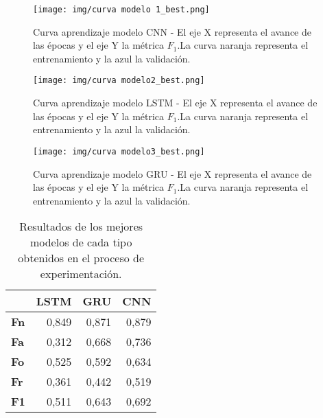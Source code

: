         \begin{figure}[H]
            \centering
            \texttt{[image: img/curva modelo 1\_best.png]}
            \caption{Curva aprendizaje modelo CNN - El eje X representa el avance de las épocas y el eje Y la métrica $F_1$.La curva naranja representa el entrenamiento y la azul la validación.}
            \label{fig:curva_model1}
        \end{figure}
        
        
        
        \begin{figure}[H]
            \centering
            \texttt{[image: img/curva modelo2\_best.png]}
            \caption{Curva aprendizaje modelo LSTM - El eje X representa el avance de las épocas y el eje Y la métrica $F_1$.La curva naranja representa el entrenamiento y la azul la validación.}
            \label{fig:curva_model2}
        \end{figure}
        
        
        
        \begin{figure}[H]
            \centering
            \texttt{[image: img/curva modelo3\_best.png]}
            \caption{Curva aprendizaje modelo GRU - El eje X representa el avance de las épocas y el eje Y la métrica $F_1$.La curva naranja representa el entrenamiento y la azul la validación.}
            \label{fig:curva_model3}
        \end{figure}


        \begin{table}[htbp]
        \caption{Resultados de los mejores modelos de cada tipo obtenidos en el proceso de experimentación.}
        \begin{center}
        \begin{tabular}{|l|r|r|r|}
        \hline
        \textbf{} & \multicolumn{1}{l|}{\textbf{LSTM}} & \multicolumn{1}{l|}{\textbf{GRU}} & \multicolumn{1}{l|}{\textbf{CNN}} \\ \hline
        \textbf{Fn} & 0,849 & 0,871 & 0,879 \\ \hline
        \textbf{Fa} & 0,312 & 0,668 & 0,736 \\ \hline
        \textbf{Fo} & 0,525 & 0,592 & 0,634 \\ \hline
        \textbf{Fr} & 0,361 & 0,442 & 0,519 \\ \hline
        \textbf{F1} & 0,511 & 0,643 & 0,692 \\ \hline
        \end{tabular}
        \end{center}
        \label{table:MejoresModelosPropios}
        \end{table}

